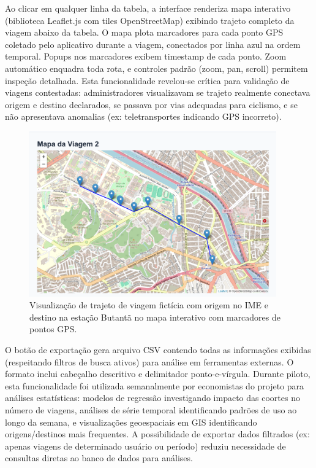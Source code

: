 Ao clicar em qualquer linha da tabela, a interface renderiza mapa interativo (biblioteca Leaflet.js com tiles OpenStreetMap) exibindo trajeto completo da viagem abaixo da tabela. O mapa plota marcadores para cada ponto GPS coletado pelo aplicativo durante a viagem, conectados por linha azul na ordem temporal. Popups nos marcadores exibem timestamp de cada ponto. Zoom automático enquadra toda rota, e controles padrão (zoom, pan, scroll) permitem inspeção detalhada. Esta funcionalidade revelou-se crítica para validação de viagens contestadas: administradores visualizavam se trajeto realmente conectava origem e destino declarados, se passava por vias adequadas para ciclismo, e se não apresentava anomalias (ex: teletransportes indicando GPS incorreto).

\begin{figure}[H]
    \centering
    \includegraphics[width=0.95\textwidth]{figuras/mapa_contestacao.PNG}
    \caption{Visualização de trajeto de viagem fictícia com origem no IME e destino na estação Butantã no mapa interativo com marcadores de pontos GPS.}
    \label{fig:mapa_contestacao}
  \end{figure}

O botão de exportação gera arquivo CSV contendo todas as informações exibidas (respeitando filtros de busca ativos) para análise em ferramentas externas. O formato inclui cabeçalho descritivo e delimitador ponto-e-vírgula. Durante piloto, esta funcionalidade foi utilizada semanalmente por economistas do projeto para análises estatísticas: modelos de regressão investigando impacto das coortes no número de viagens, análises de série temporal identificando padrões de uso ao longo da semana, e visualizações geoespaciais em GIS identificando origens/destinos mais frequentes. A possibilidade de exportar dados filtrados (ex: apenas viagens de determinado usuário ou período) reduziu necessidade de consultas diretas ao banco de dados para análises.

